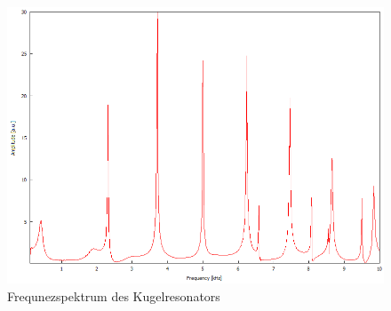 \begin{figure}
    \caption{Frequnezspektrum des Kugelresonators}
\includegraphics[width = \textwidth]{figure/Kugelresonanzspektrum.png}
\end{figure}


